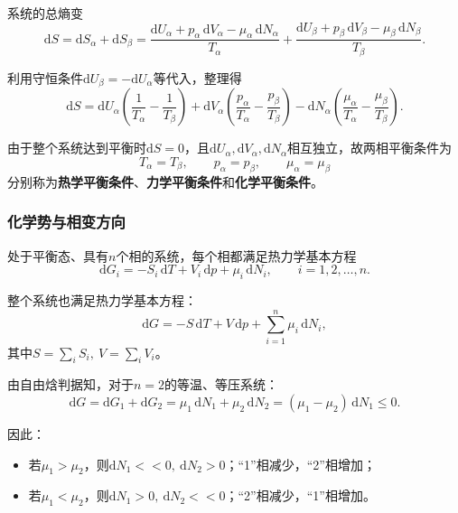 \documentclass[UTF8]{ctexart}
\theoremstyle{definition}
\begin{document}
系统的总熵变
\begin{equation}
\mathrm{d}S = \mathrm{d}S_\alpha+\mathrm{d}S_\beta
= \frac{\mathrm{d}U_\alpha+p_\alpha\,\mathrm{d}V_\alpha-\mu_\alpha\,\mathrm{d}N_\alpha}{T_\alpha}
+ \frac{\mathrm{d}U_\beta+p_\beta\,\mathrm{d}V_\beta-\mu_\beta\,\mathrm{d}N_\beta}{T_\beta}.
\end{equation}

利用守恒条件$\mathrm{d}U_\beta=-\mathrm{d}U_\alpha$等代入，整理得
\begin{equation}
\mathrm{d}S
= \mathrm{d}U_\alpha\!\left(\frac{1}{T_\alpha}-\frac{1}{T_\beta}\right)
+ \mathrm{d}V_\alpha\!\left(\frac{p_\alpha}{T_\alpha}-\frac{p_\beta}{T_\beta}\right)
- \mathrm{d}N_\alpha\!\left(\frac{\mu_\alpha}{T_\alpha}-\frac{\mu_\beta}{T_\beta}\right).
\end{equation}

由于整个系统达到平衡时$\mathrm{d}S=0$，且$\mathrm{d}U_\alpha,\mathrm{d}V_\alpha,\mathrm{d}N_\alpha$相互独立，故两相平衡条件为
\begin{equation}
\boxed{T_\alpha=T_\beta,\qquad p_\alpha=p_\beta,\qquad \mu_\alpha=\mu_\beta}
\end{equation}
分别称为\textbf{热学平衡条件}、\textbf{力学平衡条件}和\textbf{化学平衡条件}。

\subsubsection*{化学势与相变方向}

处于平衡态、具有$n$个相的系统，每个相都满足热力学基本方程
\begin{equation}
\mathrm{d}G_i = -S_i\,\mathrm{d}T + V_i\,\mathrm{d}p + \mu_i\,\mathrm{d}N_i,\qquad i=1,2,\dots,n.
\end{equation}

整个系统也满足热力学基本方程：
\begin{equation}
\mathrm{d}G = -S\,\mathrm{d}T + V\,\mathrm{d}p + \sum_{i=1}^{n}\mu_i\,\mathrm{d}N_i,
\end{equation}
其中$S=\sum_i S_i,\ V=\sum_i V_i$。

由自由焓判据知，对于$n=2$的等温、等压系统：
\begin{equation}
\mathrm{d}G = \mathrm{d}G_1+\mathrm{d}G_2 = \mu_1\,\mathrm{d}N_1+\mu_2\,\mathrm{d}N_2
= (\mu_1-\mu_2)\,\mathrm{d}N_1\le 0.
\end{equation}

因此：
\begin{itemize}
\item 若$\mu_1>\mu_2$，则$\mathrm{d}N_1<<0,\ \mathrm{d}N_2>0$；``1''相减少，``2''相增加；
\item 若$\mu_1<\mu_2$，则$\mathrm{d}N_1>0,\ \mathrm{d}N_2<<0$；``2''相减少，``1''相增加。
\end{itemize}
\end{document}
